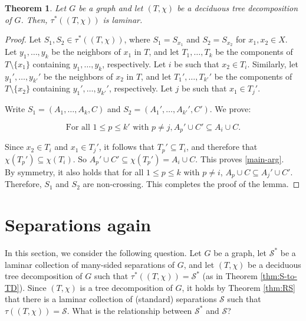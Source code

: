 \documentclass[12pt]{amsart}
\newtheorem{theorem}{Theorem}
\begin{document}
\begin{theorem}
Let $G$ be a graph and let $(T, \chi)$ be a deciduous tree decomposition of $G$. Then, $\tau^*((T, \chi))$ is laminar.
\end{theorem}
\begin{proof}
Let $S_1, S_2 \in \tau^*((T, \chi))$, where $S_1 = S_{x_1}$ and $S_2 = S_{x_2}$ for $x_1, x_2 \in X$. Let $y_1, \hdots, y_k$ be the neighbors of $x_1$ in $T$, and let $T_1, \hdots, T_k$ be the components of $T \setminus \{x_1\}$ containing $y_1, \hdots, y_k$, respectively. Let $i$ be such that $x_2 \in T_i$. Similarly, let $y_1', \hdots, y_{k'}'$ be the neighbors of $x_2$ in $T$, and let $T_1', \hdots, T_{k'}'$ be the components of $T \setminus \{x_2\}$ containing $y_1', \hdots, y_{k'}'$, respectively. Let $j$ be such that $x_1 \in T_{j}'$.

Write $S_1 = (A_1, \hdots, A_k, C)$ and $S_2 = (A_1', \hdots, A_{k'}', C')$. We prove:

\begin{equation}
    \label{main-arg} \text{For all } 1 \leq p \leq k' \text{ with } p \neq j, A_p' \cup C' \subseteq A_i \cup C\text{.}
\end{equation}

Since $x_2 \in T_i$ and $x_1 \in T_j'$, it follows that $T_p' \subseteq T_i$, and therefore that $\chi(T_p') \subseteq \chi(T_i)$. So $A_p' \cup C' \subseteq \chi(T_p') = A_i \cup C$. This proves \eqref{main-arg}. \\

By symmetry, it also holds that for all $1 \leq p \leq k$ with $p \neq i$, $A_p \cup C \subseteq A_j' \cup C'$. Therefore, $S_1$ and $S_2$ are non-crossing. This completes the proof of the lemma.
\end{proof}

\section{Separations again}
In this section, we consider the following question. Let $G$ be a graph, let $\mathcal{S}^*$ be a laminar collection of many-sided separations of $G$, and let $(T, \chi)$ be a deciduous tree decomposition of $G$ such that $\tau^*((T, \chi)) = \mathcal{S}^*$ (as in Theorem \ref{thm:S-to-TD}). Since $(T, \chi)$ is a tree decomposition of $G$, it holds by Theorem \ref{thm:RS} that there is a laminar collection of (standard) separations $\mathcal{S}$ such that $\tau((T, \chi)) = \mathcal{S}$. What is the relationship between $\mathcal{S}^*$ and $\mathcal{S}$?
\end{document}
